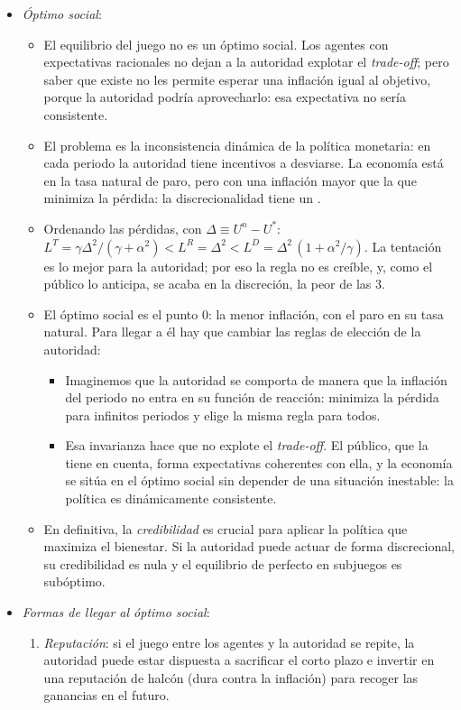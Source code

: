 \documentclass[11pt]{article}
\begin{document}
\begin{itemize}
\item \emph{Óptimo social}:
  \begin{itemize}
  \item El equilibrio del juego no es un óptimo social. Los agentes con expectativas racionales no dejan a la autoridad explotar el \emph{trade-off}; pero saber que existe no les permite esperar una inflación igual al objetivo, porque la autoridad podría aprovecharlo: esa expectativa no sería consistente.
  \item El problema es la inconsistencia dinámica de la política monetaria: en cada periodo la autoridad tiene incentivos a desviarse. La economía está en la tasa natural de paro, pero con una inflación mayor que la que minimiza la pérdida: la discrecionalidad tiene un .
  \item Ordenando las pérdidas, con $\Delta\equiv U^n-U^*$: $L^T=\gamma\Delta^2/(\gamma+\alpha^2)<L^R=\Delta^2<L^D=\Delta^2\,(1+\alpha^2/\gamma)$. La tentación es lo mejor para la autoridad; por eso la regla no es creíble, y, como el público lo anticipa, se acaba en la discreción, la peor de las 3.
  \item El óptimo social es el punto 0: la menor inflación, con el paro en su tasa natural. Para llegar a él hay que cambiar las reglas de elección de la autoridad:
    \begin{itemize}
    \item Imaginemos que la autoridad se comporta de manera que la inflación del periodo no entra en su función de reacción: minimiza la pérdida para infinitos periodos y elige la misma regla para todos.
    \item Esa invarianza hace que no explote el \emph{trade-off}. El público, que la tiene en cuenta, forma expectativas coherentes con ella, y la economía se sitúa en el óptimo social sin depender de una situación inestable: la política es dinámicamente consistente.
    \end{itemize}
  \item En definitiva, la \emph{credibilidad} es crucial para aplicar la política que maximiza el bienestar. Si la autoridad puede actuar de forma discrecional, su credibilidad es nula y el equilibrio de  perfecto en subjuegos es subóptimo.
  \end{itemize}
\item \emph{Formas de llegar al óptimo social}:
  \begin{enumerate}[label=\alph*)]
  \item \emph{Reputación}\nocite{BarroGordon1983Rules}: si el juego entre los agentes y la autoridad se repite, la autoridad puede estar dispuesta a sacrificar el corto plazo e invertir en una reputación de halcón (dura contra la inflación) para recoger las ganancias en el futuro.

\end{enumerate}
\end{itemize}
\end{document}

